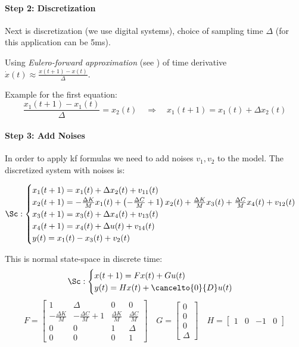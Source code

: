 \begin{exa}
    \paragraph{Step 2: Discretization}
    Next is discretization (we use digital systems), choice of sampling time $\Delta$ (for this application can be 5ms).

    Using \emph{Eulero-forward approximation} (see ) of time derivative $\dot{x}(t) \approx \frac{x(t+1)-x(t)}{\Delta}$.

    Example for the first equation:
    \[
        \frac{x_1(t+1)-x_1(t)}{\Delta} = x_2(t) \quad\Rightarrow\quad x_1(t+1) = x_1(t) + \Delta x_2(t)
    \]

    \paragraph{Step 3: Add Noises} In order to apply \gls{kf} formulas we need to add noises $v_1, v_2$ to the model. 
    The discretized system with noises is:

    \[  
        \Sc:
        \begin{cases}
            x_1(t+1) = x_1(t) + \Delta x_2(t) + v_{11}(t) \\
            x_2(t+1) = -\frac{\Delta K}{M} x_1(t) + \left( -\frac{\Delta C}{M} + 1 \right)x_2(t) + \frac{\Delta K}{M} x_3(t) + \frac{\Delta C}{M} x_4(t) + v_{12}(t) \\
            x_3(t+1) = x_3(t) + \Delta x_4(t) + v_{13}(t) \\
            x_4(t+1) = x_4(t) + \Delta u(t) + v_{14}(t) \\
            y(t) = x_1(t) - x_3(t) + v_2(t)
        \end{cases}
    \]

    This is normal state-space in discrete time:
    \[  
        \Sc:
        \begin{cases}
            x(t+1) = Fx(t) + Gu(t) \\
            y(t) = Hx(t) + \cancelto{0}{D}u(t)
        \end{cases}
    \]
    \[
        F = \begin{bmatrix}
            1 & \Delta & 0 & 0 \\
            -\frac{\Delta K}{M} & -\frac{\Delta C}{M}+1 & \frac{\Delta K}{M} & \frac{\Delta C}{M} \\
            0 & 0 & 1 & \Delta \\
            0 & 0 & 0 & 1
        \end{bmatrix}
        \quad G = \begin{bmatrix}
            0 \\ 0 \\ 0 \\ \Delta
        \end{bmatrix}
        \quad H = \begin{bmatrix}
            1 & 0 & -1 & 0
        \end{bmatrix}
    \]


\end{exa}
